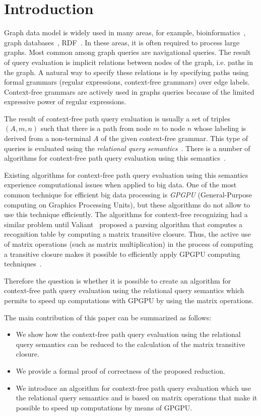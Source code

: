 \section{Introduction}
Graph data model is widely used in many areas, for example, bioinformatics~\cite{Bio}, graph databases~\cite{graphDB}, RDF~\cite{RDF}. In these areas, it is often required to process large graphs. Most common among graph queries are navigational queries. The result of query evaluation is implicit relations between nodes of the graph, i.e. paths in the graph. A natural way to specify these relations is by specifying paths using formal grammars (regular expressions, context-free grammars) over edge labels. Context-free grammars are actively used in graphs queries because of the limited expressive power of regular expressions. 

The result of context-free path query evaluation is usually a set of triples $(A, m, n)$ such that there is a path from node $m$ to node $n$ whose labeling is derived from a non-terminal $A$ of the given context-free grammar. This type of queries is evaluated using the \textit{relational query semantics}~\cite{hellingsRelational}. There is a number of algorithms for context-free path query evaluation using this semantics~\cite{GLL, hellingsRelational, RDF}.

Existing algorithms for context-free path query evaluation using this semantics experience computational issues when applied to big data. One of the most common technique for efficient big data processing is \textit{GPGPU} (General-Purpose computing on Graphics Processing Units), but these algorithms do not allow to use this technique efficiently. The algorithms for context-free recognizing had a similar problem until Valiant~\cite{valiant} proposed a parsing algorithm that computes a recognition table by computing a matrix transitive closure. Thus, the active use of matrix operations (such as matrix multiplication) in the process of computing a transitive closure makes it possible to efficiently apply GPGPU computing techniques~\cite{matricesOnGPGPU}.

Therefore the question is whether it is possible to create an algorithm for context-free path query evaluation using the relational query semantics which permits to speed up computations with GPGPU by using the matrix operations.

The main contribution of this paper can be summarized as follows:
\begin{itemize}
	\item We show how the context-free path query evaluation using the relational query semantics can be reduced to the calculation of the matrix transitive closure.
	\item We provide a formal proof of correctness of the proposed reduction.
	\item We introduce an algorithm for context-free path query evaluation which use the relational query semantics and is based on matrix operations that make it possible to speed up computations by means of GPGPU.
\end{itemize}
